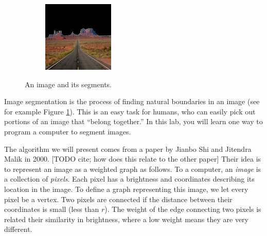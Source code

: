 \begin{figure}
\begin{subfigure}{0.31\textwidth}
    \end{subfigure}
    \hspace*{\fill}
    \begin{subfigure}{0.31\textwidth}
        \includegraphics[width=\textwidth]{PosMon.png}
    \end{subfigure}
    
\caption{An image and its segments.}
\label{fig:monument}
\end{figure}
Image segmentation is the process of finding natural boundaries in an image (see for example Figure \ref{fig:monument}).
This is an easy task for humans, who can easily pick out portions of an image that ``belong together.''
In this lab, you will learn one way to program a computer to segment images.

The algorithm we will present comes from a paper by Jianbo Shi and Jitendra Malik in 2000. [TODO cite; how does this relate to the other paper]
Their idea is to represent an image as a weighted graph as follows. 
To a computer, an \emph{image} is a collection of \emph{pixels}. 
Each pixel has a brightness and coordinates describing its location in the image.
To define a graph representing this image, we let every pixel be a vertex.
Two pixels are connected if the distance between their coordinates is small (less than $r$).
The weight of the edge connecting two pixels is related their similarity in brightness, where a low weight means they are very different.

